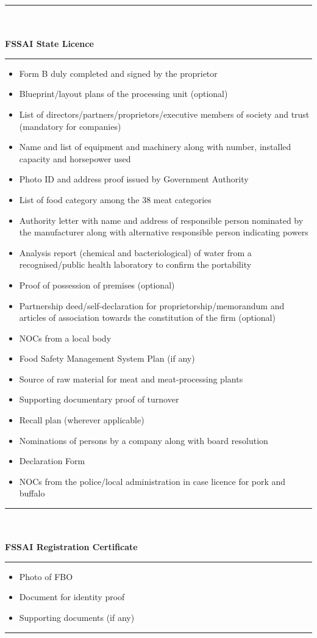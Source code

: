 \documentclass[a4paper, 12pt, twoside]{article}
\begin{document}
 \noindent\rule{16cm}{0.4pt}\\
	\\
\textbf{FSSAI State Licence}\\
\noindent\rule{16cm}{0.4pt}
\begin{itemize}[noitemsep]
\item Form B duly completed and signed by the proprietor
\item Blueprint/layout plans of the processing unit (optional) 
\item List of directors/partners/proprietors/executive members of society and trust (mandatory for companies) 
\item Name and list of equipment and machinery along with number, installed capacity and horsepower used 
\item Photo ID and address proof issued by Government Authority 
\item List of food category among the 38 meat categories 
\item Authority letter with name and address of responsible person nominated by the manufacturer along with alternative responsible person indicating powers   
\item Analysis report (chemical and bacteriological) of water from a recognised/public health laboratory to confirm the portability 
\item Proof of possession of premises (optional) 
\item Partnership deed/self-declaration for proprietorship/memorandum and articles of association towards the constitution of the firm (optional) 
\item NOCs from a local body 
\item Food Safety Management System Plan (if any) 
\item Source of raw material for meat and meat-processing plants 
\item Supporting documentary proof of turnover 
\item Recall plan (wherever applicable) 
\item Nominations of persons by a company along with board resolution 
\item Declaration Form 
\item NOCs from the police/local administration in case licence for pork and buffalo  
\end{itemize}

\noindent\rule{16cm}{0.4pt}\\
	\\
\textbf{FSSAI Registration Certificate}\\
\noindent\rule{16cm}{0.4pt}
\begin{itemize}[noitemsep]
\item Photo of FBO \\
\item Document for identity proof \\
\item Supporting documents (if any) \\
\end{itemize}
\noindent\rule{16cm}{0.4pt}\\
\newpage
\end{document}
